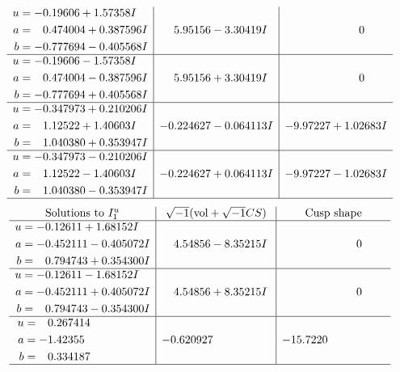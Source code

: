 \documentclass[1p]{elsarticle_modified}
\theoremstyle{definition}
\newcommand{\I}{\sqrt{-1}}
\begin{document}
$$\begin{array}{c|c|c}
\begin{aligned}
u &= -0.19606 + 1.57358 I \\
a &= \phantom{-}0.474004 + 0.387596 I \\
b &= -0.777694 - 0.405568 I\end{aligned}
 & \phantom{-}5.95156 - 3.30419 I & \phantom{-0.000000 } 0 \\ \hline\begin{aligned}
u &= -0.19606 - 1.57358 I \\
a &= \phantom{-}0.474004 - 0.387596 I \\
b &= -0.777694 + 0.405568 I\end{aligned}
 & \phantom{-}5.95156 + 3.30419 I & \phantom{-0.000000 } 0 \\ \hline\begin{aligned}
u &= -0.347973 + 0.210206 I \\
a &= \phantom{-}1.12522 + 1.40603 I \\
b &= \phantom{-}1.040380 + 0.353947 I\end{aligned}
 & -0.224627 - 0.064113 I & -9.97227 + 1.02683 I \\ \hline\begin{aligned}
u &= -0.347973 - 0.210206 I \\
a &= \phantom{-}1.12522 - 1.40603 I \\
b &= \phantom{-}1.040380 - 0.353947 I\end{aligned}
 & -0.224627 + 0.064113 I & -9.97227 - 1.02683 I\\
 \hline 
 \end{array}$$\newpage$$\begin{array}{c|c|c}  
\text{Solutions to }I^u_{1}& \I (\text{vol} + \sqrt{-1}CS) & \text{Cusp shape}\\
 \hline 
\begin{aligned}
u &= -0.12611 + 1.68152 I \\
a &= -0.452111 - 0.405072 I \\
b &= \phantom{-}0.794743 + 0.354300 I\end{aligned}
 & \phantom{-}4.54856 - 8.35215 I & \phantom{-0.000000 } 0 \\ \hline\begin{aligned}
u &= -0.12611 - 1.68152 I \\
a &= -0.452111 + 0.405072 I \\
b &= \phantom{-}0.794743 - 0.354300 I\end{aligned}
 & \phantom{-}4.54856 + 8.35215 I & \phantom{-0.000000 } 0 \\ \hline\begin{aligned}
u &= \phantom{-}0.267414\phantom{ +0.000000I} \\
a &= -1.42355\phantom{ +0.000000I} \\
b &= \phantom{-}0.334187\phantom{ +0.000000I}\end{aligned}
 & -0.620927\phantom{ +0.000000I} & -15.7220\phantom{ +0.000000I}\\
 \hline 
 \end{array}$$\newpage\newpage\renewcommand{\arraystretch}{1}
\end{document}
